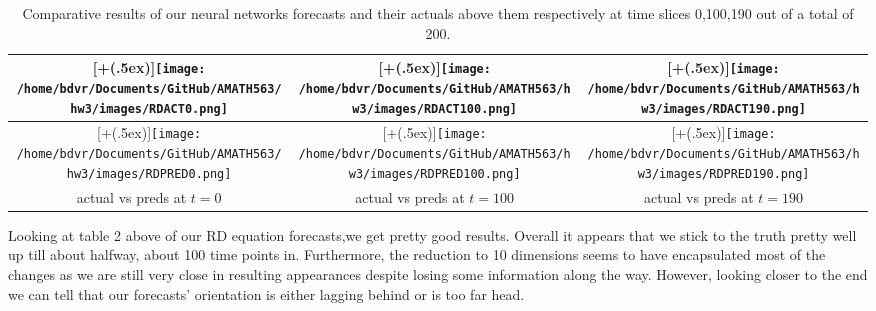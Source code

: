\documentclass[12pt]{article}
\newcommand*{\addheight}[2][.5ex]{%
	\raisebox{0pt}[\dimexpr\height+(#1)\relax]{#2}%
}
\begin{document}
\begin{table}[H]
	\begin{center}
		\begin{tabular*}{0.98\linewidth}{|c|c|c|}
			\hline
			\addheight{\texttt{[image: /home/bdvr/Documents/GitHub/AMATH563/hw3/images/RDACT0.png]}} 
			&
			\addheight{\texttt{[image: /home/bdvr/Documents/GitHub/AMATH563/hw3/images/RDACT100.png]}}
			&
			\addheight{\texttt{[image: /home/bdvr/Documents/GitHub/AMATH563/hw3/images/RDACT190.png]}}
			\\
			\hline
			\addheight{\texttt{[image: /home/bdvr/Documents/GitHub/AMATH563/hw3/images/RDPRED0.png]}} 
			&
			\addheight{\texttt{[image: /home/bdvr/Documents/GitHub/AMATH563/hw3/images/RDPRED100.png]}}
			&
			\addheight{\texttt{[image: /home/bdvr/Documents/GitHub/AMATH563/hw3/images/RDPRED190.png]}}
			\\
			\small actual vs preds at $t = 0$ &  			
			\small actual vs preds at $t = 100$  &
			\small actual vs preds at $t = 190$\\
			\hline
		\end{tabular*}
		\caption{Comparative results of our neural networks forecasts and their actuals above them respectively at time slices 0,100,190 out of a total of 200.}
	\end{center}
\end{table}
\vspace*{-\baselineskip}\vspace*{-\baselineskip}
Looking at table 2 above of our RD equation forecasts,we get pretty good results. Overall it appears that we stick to the truth pretty well up till about halfway, about 100 time points in. Furthermore, the reduction to 10 dimensions seems to have encapsulated most of the changes as we are still very close in resulting appearances despite losing some information along the way. However, looking closer to the end we can tell that our forecasts' orientation is either lagging behind or is too far head.
\noindent
\end{document}
